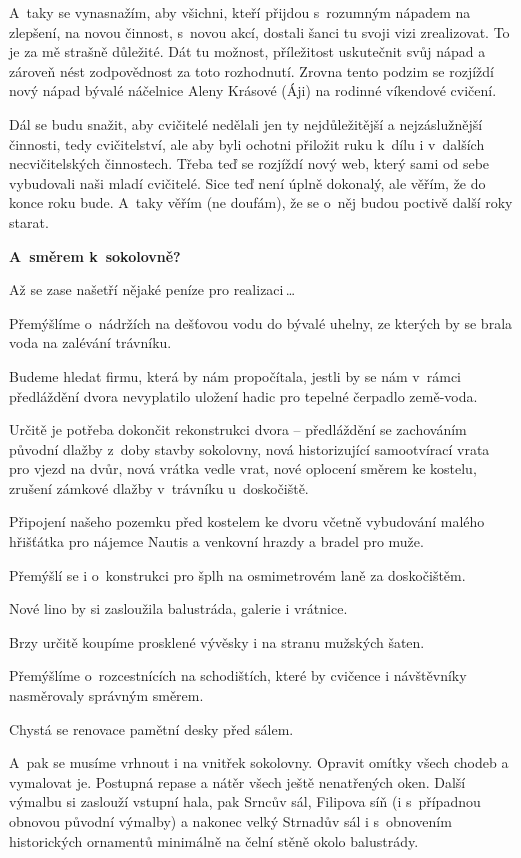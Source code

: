 \documentclass[11pt]{article}
\begin{document}
A~taky se vynasnažím, aby všichni, kteří přijdou s~rozumným nápadem na zlepšení, na novou činnost, s~novou akcí, dostali šanci tu svoji vizi zrealizovat. To je za mě strašně důležité. Dát tu možnost, příležitost uskutečnit svůj nápad a zároveň nést zodpovědnost za toto rozhodnutí. Zrovna tento podzim se rozjíždí nový nápad bývalé náčelnice Aleny Krásové (Áji) na rodinné víkendové cvičení.

Dál se budu snažit, aby cvičitelé nedělali jen ty nejdůležitější a nejzáslužnější činnosti, tedy cvičitelství, ale aby byli ochotni přiložit ruku k~dílu i v~dalších necvičitelských činnostech. Třeba teď se rozjíždí nový web, který sami od sebe vybudovali naši mladí cvičitelé. Sice teď není úplně dokonalý, ale věřím, že do konce roku bude. A~taky věřím (ne doufám), že se o~něj budou poctivě další roky starat.  

\textbf{A~směrem k~sokolovně?}

Až se zase našetří nějaké peníze pro realizaci\,\ldots

Přemýšlíme o~nádržích na dešťovou vodu do bývalé uhelny, ze kterých by se brala voda na zalévání trávníku.

Budeme hledat firmu, která by nám propočítala, jestli by se nám v~rámci předláždění dvora nevyplatilo uložení hadic pro tepelné čerpadlo země-voda.

Určitě je potřeba dokončit rekonstrukci dvora – předláždění se zachováním původní dlažby z~doby stavby sokolovny, nová historizující samootvírací vrata pro vjezd na dvůr, nová vrátka vedle vrat, nové oplocení směrem ke kostelu, zrušení zámkové dlažby v~trávníku u~doskočiště.

Připojení našeho pozemku před kostelem ke dvoru včetně vybudování malého hřišťátka pro nájemce Nautis a venkovní hrazdy a bradel pro muže.

Přemýšlí se i o~konstrukci pro šplh na osmimetrovém laně za doskočištěm.

Nové lino by si zasloužila balustráda, galerie i vrátnice.

Brzy určitě koupíme prosklené vývěsky i na stranu mužských šaten.

Přemýšlíme o~rozcestnících na schodištích, které by cvičence i návštěvníky nasměrovaly správným směrem.

Chystá se renovace pamětní desky před sálem.

A~pak se musíme vrhnout i na vnitřek sokolovny. Opravit omítky všech chodeb a vymalovat je. Postupná repase a nátěr všech ještě nenatřených oken. Další výmalbu si zaslouží vstupní hala, pak Srncův sál, Filipova síň (i s~případnou obnovou původní výmalby) a nakonec velký Strnadův sál i s~obnovením historických ornamentů minimálně na čelní stěně okolo balustrády.
\end{document}
